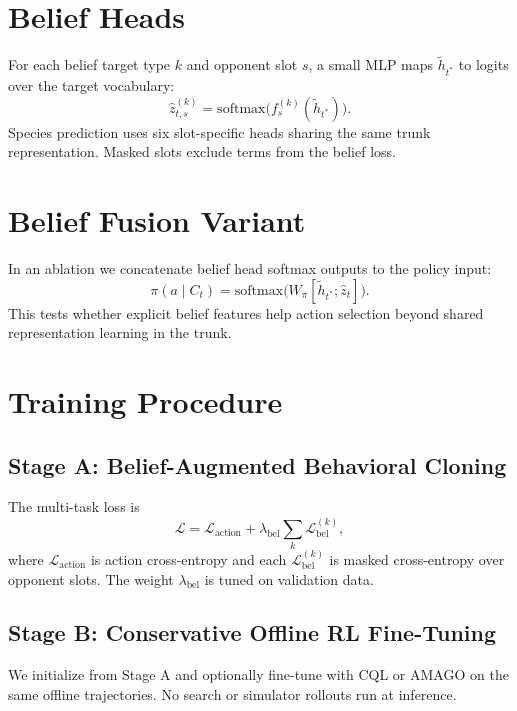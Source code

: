 \section{Belief Heads}

For each belief target type $k$ and opponent slot $s$, a small MLP maps
$\tilde{h}_{t^*}$ to logits over the target vocabulary:
\[
  \hat{z}_{t,s}^{(k)} = \mathrm{softmax}\bigl(f_s^{(k)}(\tilde{h}_{t^*})\bigr).
\]
Species prediction uses six slot-specific heads sharing the same trunk
representation. Masked slots exclude terms from the belief loss.

\section{Belief Fusion Variant}

In an ablation we concatenate belief head softmax outputs to the policy input:
\[
  \pi(a \mid C_t) = \mathrm{softmax}\bigl(W_\pi [\tilde{h}_{t^*}; \hat{z}_t]\bigr).
\]
This tests whether explicit belief features help action selection beyond shared
representation learning in the trunk.

\section{Training Procedure}

\subsection{Stage A: Belief-Augmented Behavioral Cloning}

The multi-task loss is
\begin{equation}
  \mathcal{L} = \mathcal{L}_\mathrm{action}
    + \lambda_\mathrm{bel} \sum_k \mathcal{L}_\mathrm{bel}^{(k)},
  \label{eq:multitask}
\end{equation}
where $\mathcal{L}_\mathrm{action}$ is action cross-entropy and each
$\mathcal{L}_\mathrm{bel}^{(k)}$ is masked cross-entropy over opponent slots.
The weight $\lambda_\mathrm{bel}$ is tuned on validation data.

\subsection{Stage B: Conservative Offline RL Fine-Tuning}

We initialize from Stage A and optionally fine-tune with CQL or AMAGO on the
same offline trajectories. No search or simulator rollouts run at inference.

